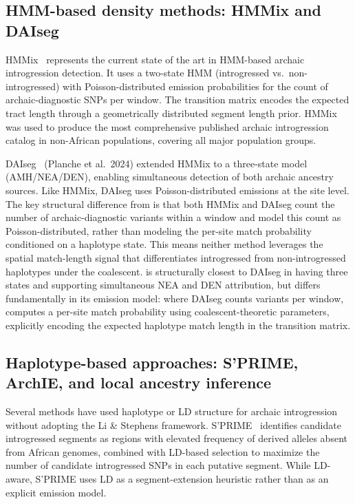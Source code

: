 \subsection*{HMM-based density methods: HMMix and DAIseg}

HMMix~\citep{skov2018detecting} represents the current state of the art in
HMM-based archaic introgression detection.
It uses a two-state HMM (introgressed vs.\ non-introgressed) with Poisson-distributed
emission probabilities for the count of archaic-diagnostic SNPs per window.
The transition matrix encodes the expected tract length through a geometrically
distributed segment length prior.
HMMix was used to produce the most comprehensive published archaic introgression
catalog in non-African populations, covering all major population groups.

DAIseg~\citep{planche2024daiseg} (Planche et al.\ 2024) extended HMMix to a three-state model (AMH/NEA/DEN),
enabling simultaneous detection of both archaic ancestry sources.
Like HMMix, DAIseg uses Poisson-distributed emissions at the site level.
The key structural difference from \AP{} is that both HMMix and DAIseg count
the number of archaic-diagnostic variants within a window and model this count
as Poisson-distributed, rather than modeling the per-site match probability
conditioned on a haplotype state.
This means neither method leverages the spatial match-length signal that
differentiates introgressed from non-introgressed haplotypes under the coalescent.
\AP{} is structurally closest to DAIseg in having three states and supporting
simultaneous NEA and DEN attribution, but differs fundamentally in its emission
model: where DAIseg counts variants per window, \AP{} computes a per-site
match probability using coalescent-theoretic parameters, explicitly encoding
the expected haplotype match length in the transition matrix.

\subsection*{Haplotype-based approaches: S'PRIME, ArchIE, and local ancestry inference}

Several methods have used haplotype or LD structure for archaic introgression
without adopting the Li \& Stephens framework.
S'PRIME~\citep{browning2018ancestry} identifies candidate introgressed segments
as regions with elevated frequency of derived alleles absent from African
genomes, combined with LD-based selection to maximize the number of candidate
introgressed SNPs in each putative segment.
While LD-aware, S'PRIME uses LD as a segment-extension heuristic rather than
as an explicit emission model.

